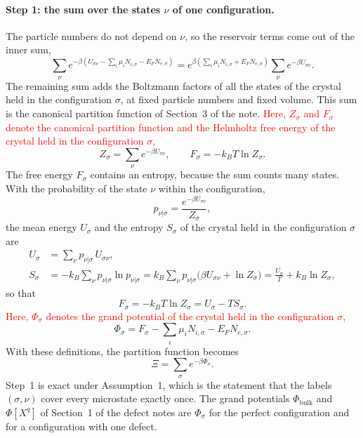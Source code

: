 \documentclass[11pt]{article}      %
\numberwithin{equation}{section}   %
\begin{document}
\paragraph{Step 1: the sum over the states $\nu$ of one configuration.}
The particle numbers do not depend on $\nu$, so the reservoir terms come out
of the inner sum,
\begin{equation*}
    \sum_{\nu}
    e^{-\beta\left(U_{\sigma\nu}-\sum_i\mu_iN_{i,\sigma}-E_FN_{e,\sigma}\right)}
    =e^{\beta\left(\sum_i\mu_iN_{i,\sigma}+E_FN_{e,\sigma}\right)}
    \sum_{\nu}e^{-\beta U_{\sigma\nu}}.
\end{equation*}
The remaining sum adds the Boltzmann factors of all the states of the
crystal held in the configuration $\sigma$, at fixed particle numbers and
fixed volume. This sum is the canonical partition function of Section~3 of
the note. \textcolor{red}{Here, $Z_\sigma$ and $F_\sigma$ denote the
canonical partition function and the Helmholtz free energy of the crystal
held in the configuration $\sigma$,}
\begin{equation*}
    Z_\sigma=\sum_{\nu}e^{-\beta U_{\sigma\nu}},
    \qquad
    F_\sigma=-k_BT\ln Z_\sigma.
\end{equation*}
The free energy $F_\sigma$ contains an entropy, because the sum counts many
states. With the probability of the state $\nu$ within the configuration,
\begin{equation*}
    p_{\nu|\sigma}=\frac{e^{-\beta U_{\sigma\nu}}}{Z_\sigma},
\end{equation*}
the mean energy $U_\sigma$ and the entropy $S_\sigma$ of the crystal held in
the configuration $\sigma$ are
\begin{align*}
    U_\sigma&=\sum_\nu p_{\nu|\sigma}\,U_{\sigma\nu},\\
    S_\sigma&=-k_B\sum_\nu p_{\nu|\sigma}\ln p_{\nu|\sigma}
    =k_B\sum_\nu p_{\nu|\sigma}\big(\beta U_{\sigma\nu}+\ln Z_\sigma\big)
    =\frac{U_\sigma}{T}+k_B\ln Z_\sigma,
\end{align*}
so that
\begin{equation*}
    F_\sigma=-k_BT\ln Z_\sigma=U_\sigma-TS_\sigma.
\end{equation*}
\textcolor{red}{Here, $\Phi_\sigma$ denotes the grand potential of the
crystal held in the configuration $\sigma$,}
\begin{equation*}
    \Phi_\sigma=F_\sigma-\sum_i\mu_iN_{i,\sigma}-E_FN_{e,\sigma}.
\end{equation*}
With these definitions, the partition function becomes
\begin{equation}
    \boxed{\Xi=\sum_{\sigma}e^{-\beta\Phi_\sigma}.}
    \label{eq:xi-sigma}
\end{equation}
Step~1 is exact under Assumption~1, which is the statement that the labels
$(\sigma,\nu)$ cover every microstate exactly once. The grand potentials
$\Phi_{\text{bulk}}$ and $\Phi[X^q]$ of Section~1 of the defect notes are
$\Phi_\sigma$ for the perfect configuration and for a configuration with
one defect.
\end{document}
